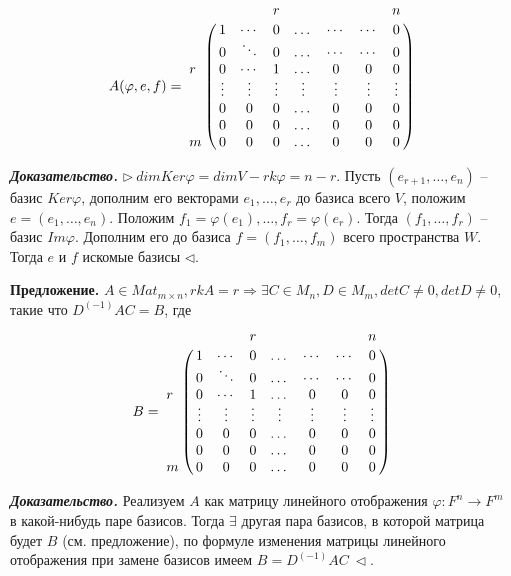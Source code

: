 \begin{equation*} A(\varphi, e, f) = \bordermatrix{ 
    	 & & & r & & & & n \cr
    	 & 1 & \cdots & 0 & \dots & \cdots & \cdots & 0 \cr 
         & 0 & \ddots & 0 & \dots & \cdots & \cdots & 0 \cr
		r & 0 & \cdots & 1 & \dots & 0 & 0 & 0  \cr
         & \vdots & \vdots & \vdots & \vdots & \vdots & \vdots & \vdots \cr
        & 0 & 0 & 0 & \dots & 0 & 0 & 0  \cr
        & 0 & 0 & 0 & \dots & 0 & 0 & 0  \cr
       m & 0 & 0 & 0 & \dots  & 0 & 0 & 0 }
\end{equation*}

\vspace{\baselineskip}
\textbf{\textit{Доказательство.}} $\rhd \ dimKer \varphi = dim V - rk \varphi = n - r$. Пусть $(e_{r+1}, \dots, e_n)$ -- базис $Ker \varphi$, дополним его векторами $e_1, \dots, e_r$  до базиса всего $V$, положим $e = (e_1, \dots, e_n)$. Положим $f_1 = \varphi(e_1), \dots, f_r = \varphi(e_r)$. Тогда $(f_1, \dots, f_r)$ -- базис $Im \varphi$. Дополним его до базиса $f = (f_1, \dots, f_m)$ всего пространства $W$. Тогда $e$ и $f$ искомые базисы $\lhd$.

\vspace{\baselineskip}
\textbf{Предложение.} $A \in Mat_{m \times n}, rkA = r \Rightarrow \exists C \in M_n, D \in M_m, detC \neq 0, detD \neq 0$, такие что $D^{(-1)} A C = B$, где 
\begin{equation*} B = \bordermatrix{ 
    	 & & & r & & & & n \cr
    	 & 1 & \cdots & 0 & \dots & \cdots & \cdots & 0 \cr 
         & 0 & \ddots & 0 & \dots & \cdots & \cdots & 0 \cr
		r & 0 & \cdots & 1 & \dots & 0 & 0 & 0  \cr
         & \vdots & \vdots & \vdots & \vdots & \vdots & \vdots & \vdots \cr
        & 0 & 0 & 0 & \dots & 0 & 0 & 0  \cr
        & 0 & 0 & 0 & \dots & 0 & 0 & 0  \cr
       m & 0 & 0 & 0 & \dots  & 0 & 0 & 0 }
\end{equation*}

\vspace{\baselineskip}
\textbf{\textit{Доказательство.}} Реализуем $A$ как матрицу линейного отображения $\varphi : F^n \rightarrow F^m$ в какой-нибудь паре базисов. Тогда $\exists$ другая пара базисов, в которой матрица будет $B$ (см. предложение), по формуле изменения матрицы линейного отображения при замене базисов имеем $B = D^{(-1)} A C \ \lhd$.

